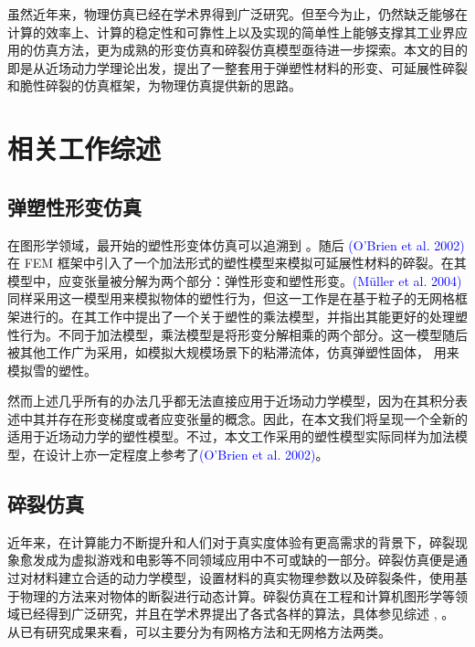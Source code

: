 虽然近年来，物理仿真已经在学术界得到广泛研究。但至今为止，仍然缺乏能够在计算的效率上、计算的稳定性和可靠性上以及实现的简单性上能够支撑其工业界应用的仿真方法，更为成熟的形变仿真和碎裂仿真模型亟待进一步探索。本文的目的即是从近场动力学理论出发，提出了一整套用于弹塑性材料的形变、可延展性碎裂和脆性碎裂的仿真框架，为物理仿真提供新的思路。

\section{相关工作综述}
\label{related_work}

\subsection{弹塑性形变仿真}

在图形学领域，最开始的塑性形变体仿真可以追溯到 。随后 \textcolor{blue}{(O'Brien et al. 2002)\parencite{OBrien2002}} 在 FEM 框架中引入了一个加法形式的塑性模型来模拟可延展性材料的碎裂。在其模型中，应变张量被分解为两个部分：弹性形变和塑性形变。\textcolor{blue}{(M\"{u}ller et al. 2004)\parencite{Muller2004}} 同样采用这一模型用来模拟物体的塑性行为，但这一工作是在基于粒子的无网格框架进行的。在其工作中提出了一个关于塑性的乘法模型，并指出其能更好的处理塑性行为。不同于加法模型，乘法模型是将形变分解相乘的两个部分。这一模型随后被其他工作广为采用，如模拟大规模场景下的粘滞流体，仿真弹塑性固体， 用来模拟雪的塑性。

然而上述几乎所有的办法几乎都无法直接应用于近场动力学模型，因为在其积分表述中其并存在形变梯度或者应变张量的概念。因此，在本文我们将呈现一个全新的适用于近场动力学的塑性模型。不过，本文工作采用的塑性模型实际同样为加法模型，在设计上亦一定程度上参考了\textcolor{blue}{(O'Brien et al. 2002)\parencite{OBrien2002}}。


\subsection{碎裂仿真}

近年来，在计算能力不断提升和人们对于真实度体验有更高需求的背景下，碎裂现象愈发成为虚拟游戏和电影等不同领域应用中不可或缺的一部分。碎裂仿真便是通过对材料建立合适的动力学模型，设置材料的真实物理参数以及碎裂条件，使用基于物理的方法来对物体的断裂进行动态计算。碎裂仿真在工程和计算机图形学等领域已经得到广泛研究，并且在学术界提出了各式各样的算法，具体参见综述 , 。 从已有研究成果来看，可以主要分为有网格方法和无网格方法两类。

